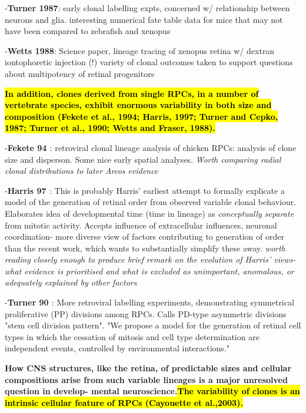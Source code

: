 -\textbf{Turner 1987\cite{Turner1987}}: early clonal labelling expts, concerned w/ relationship between neurons and glia. interesting numerical fate table data for mice that may not have been compared to zebrafish and xenopus \cite{Thuret2015}

-\textbf{Wetts 1988\cite{Wetts1988}}: Science paper, lineage tracing of xenopus retina w/ dextran iontophoretic injection (!) variety of clonal outcomes taken to support questions about multipotency of retinal progenitors

\bigskip
	\textbf{\hl{In addition, clones derived from single RPCs, in a number of vertebrate species,
exhibit enormous variability in both size and composition (Fekete
et al., 1994; Harris, 1997; Turner and Cepko, 1987; Turner et al.,
1990; Wetts and Fraser, 1988).} }

\bigskip

-\textbf{Fekete 94 \cite{Fekete1994}}: retroviral clonal lineage analysis of chicken RPCs: analysis of clone size and disperson. Some nice early spatial analyses. \textit{Worth comparing radial clonal distributions to later Arcos evidence}

-\textbf{Harris 97 \cite{Harris1997}}: This is probably Harris' earliest attempt to formally explicate a model of the generation of retinal order from observed variable clonal behaviour. Elaborates idea of developmental time (time in lineage) as \textit{conceptually separate} from mitotic activity. Accepts influence of extracellular influences, neuronal coordination- more diverse view of factors contributing to generation of order than the recent work, which wants to substantially simplify these away. \textit{worth reading closely enough to produce brief remark on the evolution of Harris' views- what evidence is prioritised and what is excluded as unimportant, anomalous, or adequately explained by other factors}

-\textbf{Turner 90 \cite{Turner1990}}: More retroviral labelling experiments, demonstrating symmetrical proliferative (PP) divisions among RPCs. Calls PD-type asymmetric divisions "stem cell division pattern". "We propose a model for the generation of retinal cell types in which the cessation of mitosis and cell type determination are independent events, controlled by environmental interactions."

\bigskip
\textbf{How CNS structures, like the
retina, of predictable sizes and cellular compositions arise from
such variable lineages is a major unresolved question in develop-
mental neuroscience.\hl{The variability of clones is an intrinsic cellular feature of RPCs
(Cayouette et al.,2003).}}

